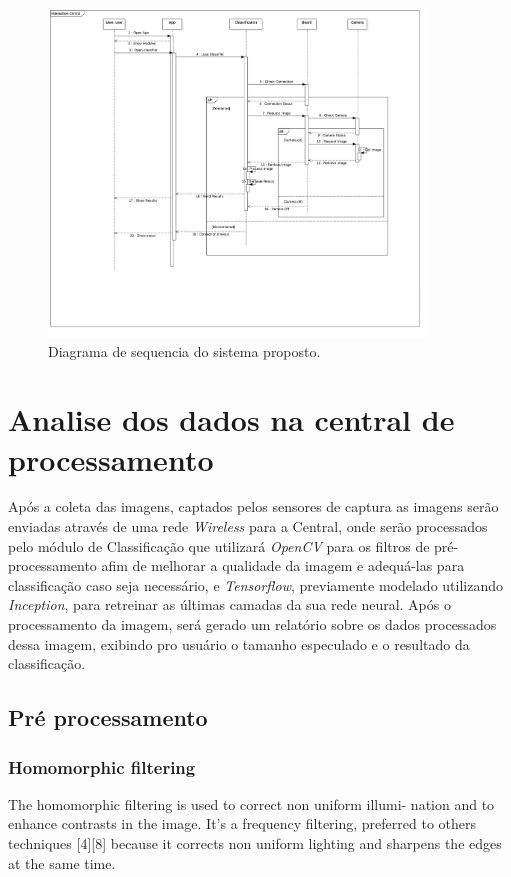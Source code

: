 \begin{figure}[ht]
	\caption{\label{fig:seqkraken}  Diagrama de sequencia do sistema proposto.}
	 \begin{center}
		\includegraphics[width = 0.9\textwidth]			{resources/sequencekraken}
    \end{center}
\end{figure}


\section{Analise dos dados na central de processamento}
Após a coleta das imagens, captados pelos sensores de captura as imagens serão enviadas através de uma rede \textit{Wireless} para a Central, onde serão processados pelo módulo de Classificação que utilizará \textit{OpenCV} para os filtros de pré-processamento afim de melhorar a qualidade da imagem e adequá-las para classificação caso seja necessário, e \textit{Tensorflow}, previamente modelado utilizando \textit{Inception}, para retreinar as últimas camadas da sua rede neural. 
Após o processamento da imagem, será gerado um relatório sobre os dados processados dessa imagem, exibindo pro usuário o tamanho especulado e o resultado da classificação.

\subsection{Pré processamento}
\subsubsection{Homomorphic filtering}
The homomorphic filtering is used to correct non uniform illumi- nation and to enhance contrasts in the image. It’s a frequency filtering, preferred to others techniques [4][8] because it corrects non uniform lighting and sharpens the edges at the same time.


